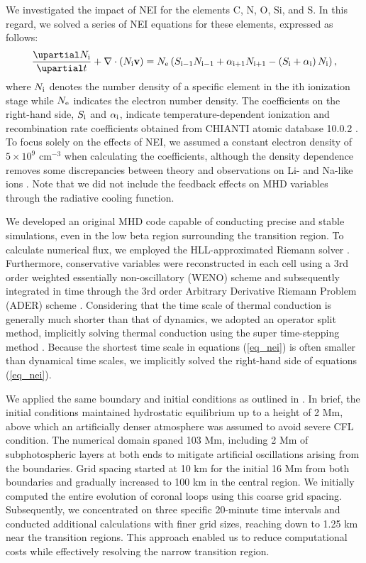 \documentclass[fleqn,usenatbib]{mnras}
\begin{document}
We investigated the impact of NEI for the elements C, N, O, Si, and S. In this regard, we solved a series of NEI equations for these elements, expressed as follows:
\begin{eqnarray}
    \frac{\upartial N_{\rm i}}{\upartial t} + \nabla \cdot \left(N_{\rm i} \mathbf{v} \right) = N_{\rm e} \left( S_{\rm i-1} N_{\rm i-1} + \alpha_{\rm i+1} N_{\rm i+1} - \left( S_{\rm i} + \alpha_{\rm i} \right) N_{\rm i} \label{eq_nei} \right), 
\end{eqnarray}
where $N_{\rm i}$ denotes the number density of a specific element in the ith ionization stage while $N_{\rm e}$ indicates the electron number density. The coefficients on the right-hand side, $S_{\rm i}$ and $\alpha_{\rm i}$, indicate temperature-dependent ionization and recombination rate coefficients obtained from CHIANTI atomic database 10.0.2 \citep{2021ApJ...909...38D}. To focus solely on the effects of NEI, we assumed a constant electron density of $5\times10^9$ cm$^{-3}$ when calculating the coefficients, although the density dependence removes some discrepancies between theory and observations on Li- and Na-like ions \citep{2023MNRAS.521.4696D}. Note that we did not include the feedback effects on MHD variables through the radiative cooling function.

We developed an original MHD code capable of conducting precise and stable simulations, even in the low beta region surrounding the transition region. To calculate numerical flux, we employed the HLL-approximated Riemann solver \citep{1991JCoPh..92..273E}. Furthermore, conservative variables were reconstructed in each cell using a 3rd order weighted essentially non-oscillatory (WENO) scheme and subsequently integrated in time through the 3rd order Arbitrary Derivative Riemann Problem (ADER) scheme \citep{2009JCoPh.228.2480B}. Considering that the time scale of thermal conduction is generally much shorter than that of dynamics, we adopted an operator split method, implicitly solving thermal conduction using the super time-stepping method \citep{2012MNRAS.422.2102M}. Because the shortest time scale in equations (\ref{eq_nei}) is often smaller than dynamical time scales, we implicitly solved the right-hand side of equations (\ref{eq_nei}).

We applied the same boundary and initial conditions as outlined in \cite{2010ApJ...712..494A}. In brief, the initial conditions maintained hydrostatic equilibrium up to a height of 2 Mm, above which an artificially denser atmosphere was assumed to avoid severe CFL condition. The numerical domain spaned 103 Mm, including 2 Mm of subphotospheric layers at both ends to mitigate artificial oscillations arising from the boundaries. Grid spacing started at 10 km for the initial 16 Mm from both boundaries and gradually increased to 100 km in the central region. We initially computed the entire evolution of coronal loops using this coarse grid spacing. Subsequently, we concentrated on three specific 20-minute time intervals and conducted additional calculations with finer grid sizes, reaching down to 1.25 km near the transition regions. This approach enabled us to reduce computational costs while effectively resolving the narrow transition region.
\end{document}
